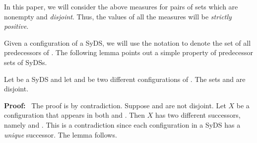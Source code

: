 \smallskip

In this paper, we will consider the above measures for pairs of sets
which are nonempty and \emph{disjoint}. 
Thus, the values of all the measures will be \emph{strictly positive}. 

\smallskip

Given a configuration \calc{} of a SyDS, we will use the notation \predset{\calc}{}
to denote the set of all predecessors of \calc.
The following lemma points out a simple property of predecessor sets
of SyDSs.

\begin{lemma}\label{lem:disjoint_pred}
Let \cals{} be a SyDS and let \calcone{} and \calctwo{} be two different
configurations of \cals.
The sets \predset{\calcone}{} and \predset{\calctwo}{} are disjoint.
\end{lemma}

\noindent
\textbf{Proof:}~ The proof is by contradiction.
Suppose \predset{\calcone}{} and \predset{\calctwo}{} are not disjoint.
Let $X$ be a configuration that appears in both
\predset{\calcone}{} and \predset{\calctwo}.
Then $X$ has two different successors, namely \calcone{} and \calctwo.
This is a contradiction since each configuration in a SyDS has a \emph{unique}
successor. The lemma follows. \QED

